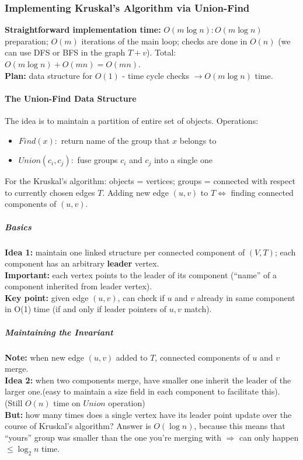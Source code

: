\documentclass{scrartcl}
\begin{document}
\subsubsection{Implementing Kruskal's Algorithm via Union-Find}
\label{sec:6-3} {\bf Straightforward implementation time:} $O(m \log n) : O(m
\log n)$ preparation; $O(m)$ iterations of the main loop; checks are done in
$O(n)$ (we
can use DFS or BFS in the graph $T + v$). Total: $O(m \log n) + O(mn) = O(mn)$.\\
{\bf Plan: } data structure for $O(1)$ - time cycle checks $\rightarrow O(m \log
n)$ time.
\paragraph{The Union-Find Data Structure}
The idea is to maintain a partition of entire set of objects. Operations:\\
\begin{itemize}
\item $Find(x):$ return name of the group that $x$ belongs to
\item $Union(c_i, c_j):$ fuse groups $c_i$ and $c_j$ into a single one
\end{itemize}
For the Kruskal's algorithm: objects = vertices; groups = connected with respect
to currently chosen edges $T$. Adding new edge $(u, v)$ to $T \Leftrightarrow $
finding connected components of $(u, v)$.

\subparagraph{Basics}
{\bf Idea 1: } maintain one linked structure per connected component of $(V,
T)$; each component has an arbitrary {\bf leader } vertex. \\
{\bf Important: } each vertex points to the leader of its component (``name'' of
a component inherited from leader vertex).\\
{\bf Key point: } given edge $(u, v)$, can check if $u$ and $v$ already in same
component in O(1) time (if and only if leader pointers of $u, v$ match).

\subparagraph{Maintaining the Invariant }
{\bf Note: } when new edge $(u, v)$ added to $T$, connected components of $u$
and $v$ merge. \\
{\bf Idea 2: } when two components merge, have smaller one inherit the leader of
the larger one.(easy to maintain a size field in each component to facilitate
this). (Still $O(n)$ time on $Union$ operation) \\
{\bf But: } how many times does a single vertex have its leader point update
 over the course of Kruskal's algorithm? Answer is $O(\log n)$, because this
 means that ``yours'' group was smaller than the one you're merging with
 $\Rightarrow $ can only happen $\leq \log_2 n$ time.
\end{document}
